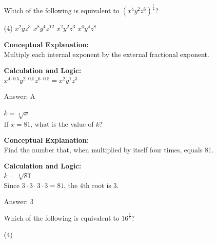 \documentclass[11pt,paper=a4,answers]{exam}
\begin{document}
\begin{questions}
\question
Which of the following is equivalent to $(x^4 y^2 z^6)^{\frac{1}{2}}$?
\begin{tasks}(4)
    \task $x^2 y z^3$
    \task $x^8 y^4 z^{12}$
    \task $x^2 y^2 z^3$
    \task $x^6 y^4 z^8$
\end{tasks}

\begin{solution}
\textbf{Conceptual Explanation:} \\
Multiply each internal exponent by the external fractional exponent.

\vspace{20pt}

\textbf{Calculation and Logic:} \\
$x^{4 \cdot 0.5} y^{2 \cdot 0.5} z^{6 \cdot 0.5} = x^2 y^1 z^3$

\vspace{25pt}

Answer: \colorbox{yellow!100}{A}
\end{solution}

\vspace{40pt}

\question
$k = \sqrt[4]{x}$ \\
If $x = 81$, what is the value of $k$?

\begin{solution}
\textbf{Conceptual Explanation:} \\
Find the number that, when multiplied by itself four times, equals 81.

\vspace{20pt}

\textbf{Calculation and Logic:} \\
$k = \sqrt[4]{81}$ \\
Since $3 \cdot 3 \cdot 3 \cdot 3 = 81$, the 4th root is 3.

\vspace{25pt}

Answer: \colorbox{yellow!100}{3}
\end{solution}

\vspace{40pt}

\question
Which of the following is equivalent to $16^{\frac{3}{4}}$?
\begin{tasks}(4)
\end{tasks}


\end{questions}
\end{document}
